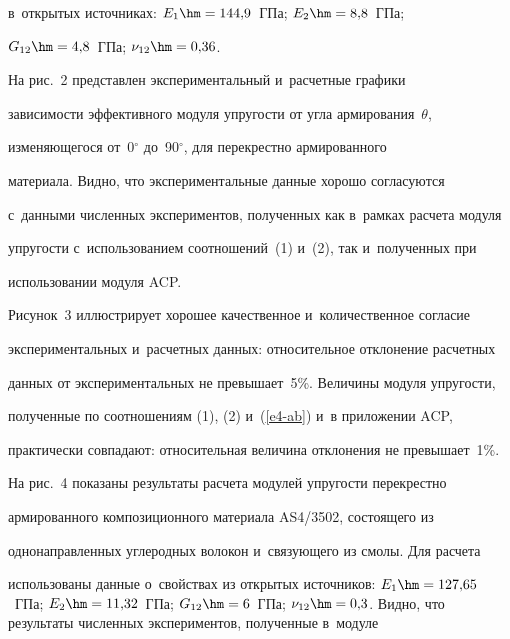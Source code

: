 в~открытых источниках: $E_1\hm= 144{,}9$~ГПа; $E_2\hm= 8{,}8$~ГПа; 


$G_{12}\hm= 4{,}8$~ГПа; $\nu_{12}\hm= 0{,}36$.


     


     На рис.~2 представлен экспериментальный и~расчетные графики 


зависимости эффективного модуля упругости  от угла армирования~$\theta$, 


изменяющегося от~0$^\circ$ до~90$^\circ$, для перекрестно армированного 


материала. Видно, что экспериментальные данные хорошо согласуются 


с~данными численных экспериментов, полученных как в~рамках расчета модуля 


упругости с~использованием соотношений~(1) и~(2), так и~полученных при 


использовании модуля ACP. 


     


      


     Рисунок~3 иллюстрирует хорошее качественное и~количественное согласие 


экспериментальных и~расчетных данных: относительное отклонение расчетных 


данных от экспериментальных не превышает~5\%. Величины модуля упругости, 


полученные по соотношениям (1), (2) и~(\ref{e4-ab}) и~в приложении ACP, 


практически совпадают: относительная величина отклонения не превышает~1\%.


     


    


     


     


     На рис.~4 показаны результаты расчета модулей упругости перекрестно 


армированного композиционного материала AS4/3502, состоящего из 


одно\-на\-прав\-лен\-ных углеродных волокон и~связующего из смолы. Для расчета 


использованы данные о~свойствах из открытых источников: $E_1\hm= 


127{,}65$~ГПа; $E_2\hm= 11{,}32$~ГПа; $G_{12}\hm= 6$~ГПа; $\nu_{12}\hm= 


0{,}3$. Видно, что результаты численных экспериментов, полученные в~модуле 


